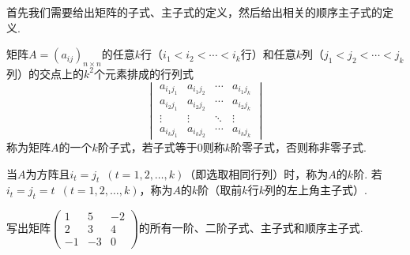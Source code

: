 首先我们需要给出矩阵的子式、主子式的定义，然后给出相关的顺序主子式的定义.
\begin{definition}
    矩阵$A=(a_{ij})_{n \times n}$的任意$k$行（$i_1<i_2<\cdots<i_k$行）和任意$k$列（$j_1<j_2<\cdots<j_k$列）的交点上的$k^2$个元素排成的行列式
    \[\begin{vmatrix}
            a_{i_1j_1} & a_{i_1j_2} & \cdots & a_{i_1j_k} \\
            a_{i_2j_1} & a_{i_2j_2} & \cdots & a_{i_2j_k} \\
            \vdots     & \vdots     & \ddots & \vdots     \\
            a_{i_kj_1} & a_{i_kj_2} & \cdots & a_{i_kj_k}
        \end{vmatrix}\]
    称为矩阵$A$的一个$k$阶子式，若子式等于0则称$k$阶零子式，否则称非零子式.

    当$A$为方阵且$i_t=j_t\enspace(t=1,2,\ldots,k)$（即选取相同行列）时，称为$A$的$k$阶. 若$i_t=j_t=t\enspace(t=1,2,\ldots,k)$，称为$A$的$k$阶（取前$k$行$k$列的左上角主子式）.
\end{definition}

\begin{example}
    写出矩阵$\begin{pmatrix}
            1 & 5 & -2 \\ 2 & 3 & 4 \\ -1 & -3 & 0
        \end{pmatrix}$的所有一阶、二阶子式、主子式和顺序主子式.
\end{example}

